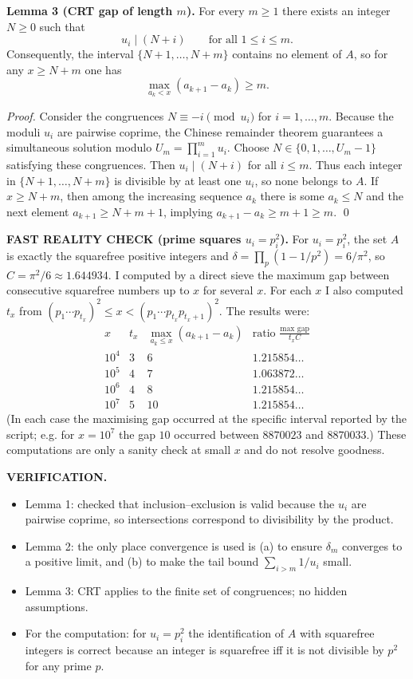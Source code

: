 \medskip
\noindent\textbf{Lemma 3 (CRT gap of length $m$).}
For every $m\ge 1$ there exists an integer $N\ge 0$ such that
\[u_i\mid (N+i)\qquad\text{for all }1\le i\le m.
\]
Consequently, the interval $\{N+1,\dots,N+m\}$ contains no element of $A$, so for any $x\ge N+m$ one has
\[\max_{a_k<x}(a_{k+1}-a_k)\ge m.
\]

\noindent\emph{Proof.}
Consider the congruences $N\equiv -i\pmod{u_i}$ for $i=1,\dots,m$.
Because the moduli $u_i$ are pairwise coprime, the Chinese remainder theorem guarantees a simultaneous solution modulo $U_m=\prod_{i=1}^m u_i$.
Choose $N\in\{0,1,\dots,U_m-1\}$ satisfying these congruences.
Then $u_i\mid(N+i)$ for all $i\le m$.
Thus each integer in $\{N+1,\dots,N+m\}$ is divisible by at least one $u_i$, so none belongs to $A$.
If $x\ge N+m$, then among the increasing sequence $a_k$ there is some $a_{k}\le N$ and the next element $a_{k+1}\ge N+m+1$, implying $a_{k+1}-a_k\ge m+1\ge m$. \qed

\medskip
\noindent\textbf{FAST REALITY CHECK (prime squares $u_i=p_i^2$).}
For $u_i=p_i^2$, the set $A$ is exactly the squarefree positive integers and
$\delta=\prod_p(1-1/p^2)=6/\pi^2$, so $C=\pi^2/6\approx 1.644934$.
I computed by a direct sieve the maximum gap between consecutive squarefree numbers up to $x$ for several $x$.
For each $x$ I also computed $t_x$ from $(p_1\cdots p_{t_x})^2\le x < (p_1\cdots p_{t_x}p_{t_x+1})^2$.
The results were:
\[
\begin{array}{c|c|c|c}
 x & t_x & \max_{a_k\le x}(a_{k+1}-a_k) & \text{ratio }\frac{\max\text{ gap}}{t_x C}\\\hline
10^4 & 3 & 6 & 1.215854\dots\\
10^5 & 4 & 7 & 1.063872\dots\\
10^6 & 4 & 8 & 1.215854\dots\\
10^7 & 5 & 10 & 1.215854\dots
\end{array}
\]
(In each case the maximising gap occurred at the specific interval reported by the script; e.g. for $x=10^7$ the gap $10$ occurred between $8870023$ and $8870033$.)
These computations are only a sanity check at small $x$ and do not resolve goodness.

\medskip
\noindent\textbf{VERIFICATION.}
\begin{itemize}
\item Lemma 1: checked that inclusion--exclusion is valid because the $u_i$ are pairwise coprime, so intersections correspond to divisibility by the product.
\item Lemma 2: the only place convergence is used is (a) to ensure $\delta_m$ converges to a positive limit, and (b) to make the tail bound $\sum_{i>m}1/u_i$ small.
\item Lemma 3: CRT applies to the finite set of congruences; no hidden assumptions.
\item For the computation: for $u_i=p_i^2$ the identification of $A$ with squarefree integers is correct because an integer is squarefree iff it is not divisible by $p^2$ for any prime $p$.
\end{itemize}

